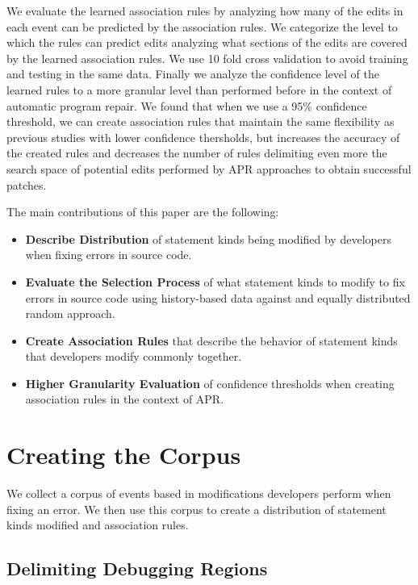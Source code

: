 \documentclass[sigconf]{acmart}
\begin{document}
We evaluate the learned association rules by 
analyzing how many of the edits
in each event can be predicted by the association rules.
We categorize the level to which the rules can predict edits
analyzing what sections of the edits are covered by the 
learned association rules. 
We use 10 fold
cross validation to avoid training and testing in the same data.
Finally we analyze
the confidence level of the learned rules to a more granular 
level than performed before in the context of automatic
program repair. We found that when we use a 95\% confidence
threshold, we can create association
rules that maintain the same flexibility as previous
studies with lower confidence thersholds\cite{Soto18}, but increases
the accuracy of the created rules and decreases the number of rules
delimiting even more the search space of potential edits
performed by APR approaches to obtain successful patches.

The main contributions of this paper are the following:
\begin{itemize}
\item \textbf{Describe Distribution} of statement kinds being
modified by developers when fixing errors in source code. 

\item \textbf{Evaluate
the Selection Process} of what statement kinds to modify 
to fix errors in source code using history-based data against
and equally distributed random approach.

\item \textbf{Create Association Rules} that describe the behavior
of statement kinds that developers modify commonly together.

\item \textbf{Higher Granularity Evaluation} 
of confidence thresholds when creating
association rules in the context of APR.

\end{itemize}

\section{Creating the Corpus}
We collect a corpus of events based in modifications 
developers perform when fixing an error. We then
use this corpus to create a distribution of statement
kinds modified and association rules.

\subsection{Delimiting Debugging Regions}
\label{delimitDebugRegions}
\end{document}
